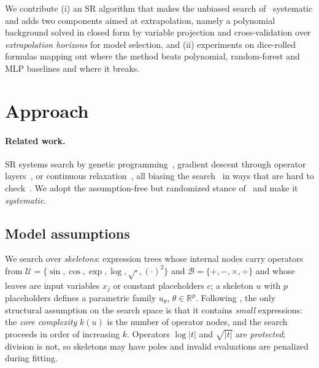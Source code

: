 \documentclass{article}
\begin{document}
\begin{sloppypar}
We contribute (i) an SR algorithm that makes the unbiased search
of~\citet{Kahlmeyer} systematic and adds two components aimed at extrapolation,
namely a polynomial background solved in closed form by variable projection and
cross-validation over \emph{extrapolation horizons} for model selection, and
(ii) experiments on dice-rolled formulas mapping out where the method beats
polynomial, random-forest and MLP baselines and where it breaks.
\end{sloppypar}

\section{Approach}
\label{sec:approach}

\paragraph{Related work.}
SR systems search by genetic programming~\citep{PySR}, gradient descent through
operator layers~\citep{NeuralSR,SymbolNet}, or continuous
relaxation~\citep{ParFam}, all biasing the search~\citep{DongZhongSurvey} in
ways that are hard to check~\citep{Kahlmeyer}. We adopt the assumption-free but
randomized stance of~\citet{Kahlmeyer} and make it \emph{systematic}.

\subsection{Model assumptions}
\label{sec:model}

We search over \emph{skeletons}: expression trees whose internal nodes carry
operators from $\mathcal{U} = \{\sin,\cos,\exp,\log,\sqrt{\cdot},(\cdot)^2\}$
and $\mathcal{B} = \{+,-,\times,\div\}$ and whose leaves are input variables
$x_j$ or constant placeholders $c$; a skeleton $u$ with $p$ placeholders defines
a parametric family $u_\theta$, $\theta \in \mathbb{R}^p$. Following
\citet{Kahlmeyer}, the only structural assumption on the search space is that it
contains \emph{small} expressions: the \emph{core complexity} $k(u)$ is the
number of operator nodes, and the search proceeds in order of increasing $k$.
Operators $\log|t|$ and $\sqrt{|t|}$ are \emph{protected}; division is not, so
skeletons may have poles and invalid evaluations are penalized during fitting.
\end{document}
